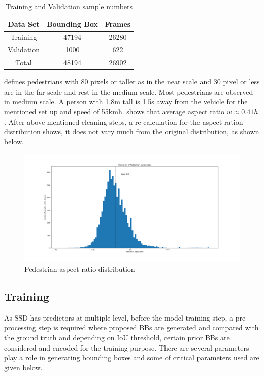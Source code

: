 \begin {table}[H]
\begin{center}
 \begin{tabular}{||c c c||}
 \hline
 Data Set & Bounding Box & Frames\\ [0.8ex] 
 \hline\hline
 Training & 47194 & 26280 \\
 \hline
 Validation & 1000 & 622 \\
 \hline
 Total & 48194 & 26902 \\
 \hline
\end{tabular}
\caption{Training and Validation sample numbers}
\end{center}
\end {table}

\cite{dollar2009pedestrian} defines pedestrians with 80 pixels or taller as in the near scale and 30 pixel or less
are in the far scale and rest in the medium scale. Most pedestrians are observed in medium scale. A person with 1.8m tall is 1.5s away from the vehicle for the mentioned set up and speed of 55km\/h. \cite{dollar2011pedestrian} shows that average aspect ratio \textit{$w \approx 0.41h$}. After above mentioned cleaning steps, a re calculation for the aspect ration distribution shows, it does not vary much from the original distribution, as shown below.

\begin{figure}[H]
\includegraphics[scale=0.4]{aspect_ratio_distribution}
\begin{center}
\caption{Pedestrian aspect ratio distribution}
\end{center}
\end{figure}

\subsection{Training }
As SSD has predictors at multiple level, before the model training step, a pre-processing step is required where proposed BBs are generated and compared with the ground truth and depending on IoU threshold, certain prior BBs are considered and encoded for the training purpose. There are several parameters play a role in generating bounding boxes and some of critical parameters used are given below.

